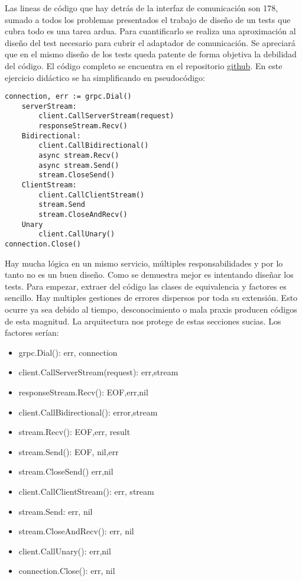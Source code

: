 Las lineas de código que hay detrás de la interfaz de comunicación son 178, sumado a todos los problemas presentados el trabajo de diseño de un tests que cubra todo es una tarea ardua.
Para cuantificarlo se realiza una aproximación al diseño del test necesario para cubrir el adaptador de comunicación.
Se apreciará que en el mismo diseño de los tests queda patente de forma objetiva la debilidad del código.
El código completo se encuentra en el repositorio \href{https://github.com/Enrikerf/pfm}{github}.
En este ejercicio didáctico se ha simplificando en pseudocódigo:

\begin{verbatim}
connection, err := grpc.Dial()
    serverStream:
        client.CallServerStream(request)
        responseStream.Recv()
    Bidirectional:
        client.CallBidirectional()
        async stream.Recv()
        async stream.Send()
        stream.CloseSend()
    ClientStream:
        client.CallClientStream()
        stream.Send
        stream.CloseAndRecv()
    Unary
        client.CallUnary()
connection.Close()
\end{verbatim}

Hay mucha lógica en un mismo servicio, múltiples responsabilidades y por lo tanto no es un buen diseño.
Como se demuestra mejor es intentando diseñar los tests.
Para empezar, extraer del código las clases de equivalencia y factores es sencillo.
Hay multiples gestiones de errores dispersos por toda su extensión.
Esto ocurre ya sea debido al tiempo, desconocimiento o mala praxis producen códigos de esta magnitud.
La arquitectura nos protege de estas secciones sucias.
Los factores serían:

\begin{itemize}
    \item grpc.Dial(): err, connection
    \item client.CallServerStream(request): err,stream
    \item responseStream.Recv(): EOF,err,nil
    \item client.CallBidirectional(): error,stream
    \item stream.Recv(): EOF,err, result
    \item stream.Send(): EOF, nil,err
    \item stream.CloseSend() err,nil
    \item client.CallClientStream(): err, stream
    \item stream.Send: err, nil
    \item stream.CloseAndRecv(): err, nil
    \item client.CallUnary(): err,nil
    \item connection.Close(): err, nil
\end{itemize}

